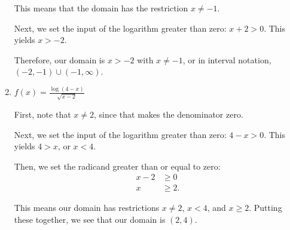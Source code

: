 \documentclass{ximera}
\begin{document}
\begin{enumerate}
\begin{expandable}
\begin{explanation}
This means that the domain has the restriction $x \ne -1$. 

Next, we set the input of the logarithm greater than zero: $x + 2 > 0$. This yields $x > -2$.

Therefore, our domain is $x > -2$ with $x \ne -1$, or in interval notation, $(-2, -1) \cup (-1, \infty)$. 
			\end{explanation}
		\end{expandable}
	\item $f(x) = \frac{\log(4 - x)}{\sqrt{x - 2}}$
		\begin{expandable}
			\begin{explanation}
First, note that $x \ne 2$, since that makes the denominator zero.

Next, we set the input of the logarithm greater than zero: $4 - x > 0$. This yields $4 > x$, or $x < 4$.

Then, we set the radicand greater than or equal to zero: \begin{align*}x - 2&\ge 0 \\ x & \ge 2. \end{align*}

This means our domain has restrictions $x \ne 2$, $x < 4$, and $x \ge 2$. Putting these together, we see that our domain is $(2, 4)$. 
			\end{explanation}
		\end{expandable}
\end{enumerate}



\end{document}
